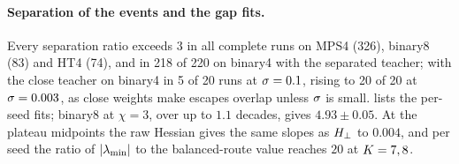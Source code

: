 \paragraph{Separation of the events and the gap fits.}
\empirical{} Every separation ratio exceeds $3$ in all complete runs on MPS4 (326), binary8 (83) and HT4 (74), and
in 218 of 220 on binary4 with the separated teacher; with the close teacher on binary4 in 5 of 20 runs at
$\sigma=0.1$, rising to 20 of 20 at $\sigma=0.003$, as close weights make escapes overlap unless $\sigma$ is small.
 lists the per-seed fits; binary8 at $\chi=3$, over up to $1.1$ decades, gives $4.93\pm0.05$.
At the plateau midpoints the raw Hessian gives the same slopes as $H_{\perp}$ to $0.004$, and per seed the ratio of
$\lvert\lambda_{\min}\rvert$ to the balanced-route value reaches $20$ at $K=7,8$.

